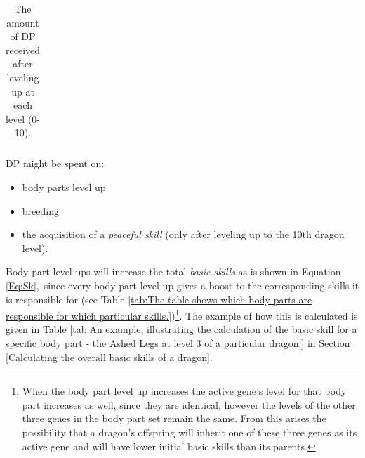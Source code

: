 \documentclass[12pt]{article}
\begin{document}
{\begin{table}[!ht]
\begin{tabular}{p{0.84in}p{2.58in}}
\end{tabular}\caption{The amount of DP received after leveling up at each level  (0-10).}
\label{tab:Number of AP received after leveling up at each level  (0-10).}

 \end{table}


\begin{samepage}
DP might be spent on:
  \begin{itemize}
	\item body parts level up\par

	\item breeding\par

	\item the acquisition of a {\it peaceful skill} (only after leveling up to the 10th dragon level).
  \end{itemize}
\end{samepage}

Body part level ups will increase the total \textit{basic skills} as is shown in  Equation \ref{Eq:Sk},\  since every body part level up gives a boost to the corresponding skills it is responsible for (see Table \ref{tab:The table shows which body parts are responsible for which particular skills.})\footnote{When the body part level up increases the active gene’s level for that body part increases as well, since they are identical, however the levels of the other three genes in the body part set remain the same. From this arises the possibility that a dragon’s offspring will inherit one of these three genes as its active gene and will have lower initial basic skills than its parents.}. The example of how this is calculated is given in  Table \ref{tab:An example, illustrating the calculation of the basic skill for a specific body part - the Ashed Legs at level 3 of a particular dragon.} in Section  \ref{Calculating the overall basic skills of a dragon}.\par

}
\end{document}
